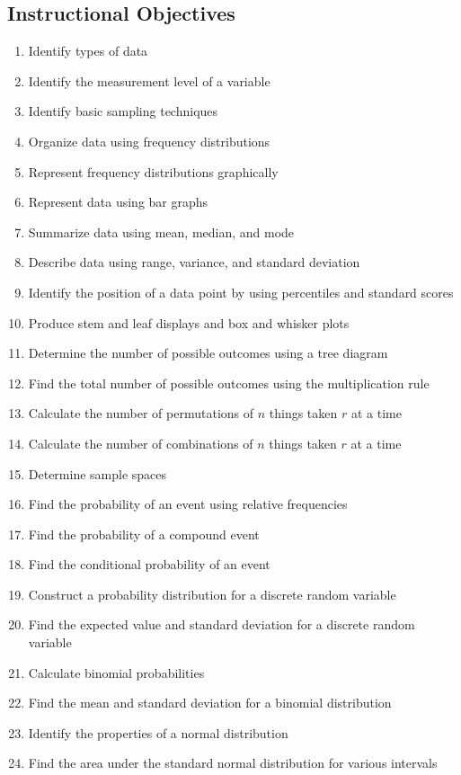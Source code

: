\documentclass[12pt,letterpaper]{article}
\begin{document}
\subsection*{Instructional Objectives}
\begin{enumerate}
\item Identify types of data
\item Identify the measurement level of a variable
\item Identify basic sampling techniques
\item Organize data using frequency distributions
\item Represent frequency distributions graphically
\item Represent data using bar graphs
\item Summarize data using mean, median, and mode
\item Describe data using range, variance, and standard deviation
\item Identify the position of a data point by using percentiles and standard scores
\item Produce stem and leaf displays and box and whisker plots
\item Determine the number of possible outcomes using a tree diagram
\item Find the total number of possible outcomes using the multiplication rule
\item Calculate the number of permutations of $n$ things taken $r$ at a time
\item Calculate the number of combinations of $n$ things taken $r$ at a time
\item Determine sample spaces
\item Find the probability of an event using relative frequencies
\item Find the probability of a compound event
\item Find the conditional probability of an event
\item Construct a probability distribution for a discrete random variable
\item Find the expected value and standard deviation for a discrete random variable
\item Calculate binomial probabilities
\item Find the mean and standard deviation for a binomial distribution
\item Identify the properties of a normal distribution
\item Find the area under the standard normal distribution for various intervals

\end{enumerate}
\end{document}
